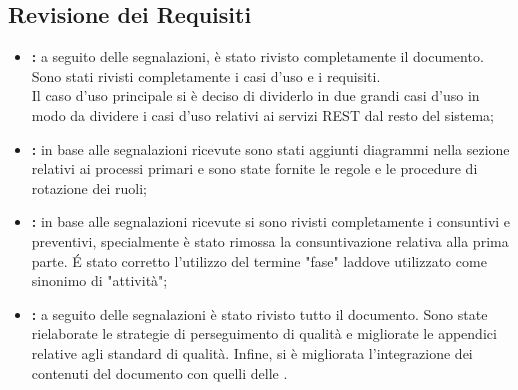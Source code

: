 	\subsection{Revisione dei Requisiti}
	\begin{itemize}
		\item \textbf{\docNameAdR:} a seguito delle segnalazioni, è stato rivisto completamente il documento. Sono stati rivisti completamente i casi d'uso e i requisiti.\\
		Il caso d'uso principale si è deciso di dividerlo in due grandi casi d'uso in modo da dividere i casi d'uso relativi ai servizi REST dal resto del sistema;
		\item \textbf{\docNameNdP:} in base alle segnalazioni ricevute sono stati aggiunti diagrammi nella sezione relativi ai processi primari e sono state fornite le regole e le procedure di rotazione dei ruoli;
		\item \textbf{\docNamePdP:} in base alle segnalazioni ricevute si sono rivisti completamente i consuntivi e preventivi, specialmente è stato rimossa la consuntivazione relativa alla prima parte. É stato corretto l'utilizzo del termine "fase" laddove utilizzato come sinonimo di "attività";
		\item \textbf{\docNamePdQ:} a seguito delle segnalazioni è stato rivisto tutto il documento. Sono state rielaborate le strategie di perseguimento di qualità e migliorate le appendici relative agli standard di qualità. Infine, si è migliorata l'integrazione dei contenuti del documento con quelli delle \docNameNdP.
	\end{itemize}
	
